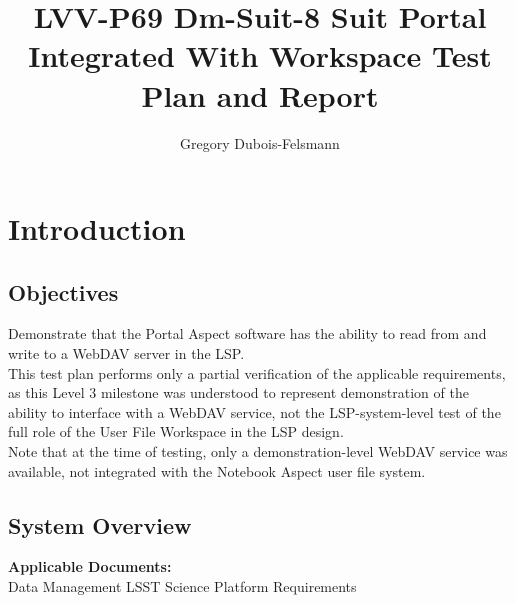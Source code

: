 \documentclass[DM,lsstdraft,STR,toc]{lsstdoc}
\begin{document}
\def\milestoneName{Dm-Suit-8 Suit Portal Integrated With Workspace}
\def\milestoneId{LVV-P69}
\def\product{LSP Services}


\title{ LVV-P69 Dm-Suit-8 Suit Portal Integrated With Workspace Test Plan and Report}
\setDocRef{\lsstDocType-\lsstDocNum}
\date{\vcsdate}
\author{ Gregory Dubois-Felsmann }






\maketitle

\section{Introduction}
\label{sect:intro}


\subsection{Objectives}
\label{sect:objectives}

 Demonstrate that the Portal Aspect software has the ability to read from
and write to a WebDAV server in the LSP.\\
This test plan performs only a partial verification of the applicable
requirements, as this Level 3 milestone was understood to represent
demonstration of the ability to interface with a WebDAV service, not the
LSP-system-level test of the full role of the User File Workspace in the
LSP design.\\[2\baselineskip]Note that at the time of testing, only a
demonstration-level WebDAV service was available, not integrated with
the Notebook Aspect user file system.



\subsection{System Overview}
\label{sect:systemoverview}

 \textbf{Applicable Documents:}\\[2\baselineskip] Data Management
LSST Science Platform Requirements
\end{document}
